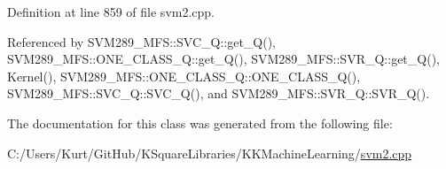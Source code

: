 Definition at line 859 of file svm2.\+cpp.



Referenced by S\+V\+M289\+\_\+\+M\+F\+S\+::\+S\+V\+C\+\_\+\+Q\+::get\+\_\+\+Q(), S\+V\+M289\+\_\+\+M\+F\+S\+::\+O\+N\+E\+\_\+\+C\+L\+A\+S\+S\+\_\+\+Q\+::get\+\_\+\+Q(), S\+V\+M289\+\_\+\+M\+F\+S\+::\+S\+V\+R\+\_\+\+Q\+::get\+\_\+\+Q(), Kernel(), S\+V\+M289\+\_\+\+M\+F\+S\+::\+O\+N\+E\+\_\+\+C\+L\+A\+S\+S\+\_\+\+Q\+::\+O\+N\+E\+\_\+\+C\+L\+A\+S\+S\+\_\+\+Q(), S\+V\+M289\+\_\+\+M\+F\+S\+::\+S\+V\+C\+\_\+\+Q\+::\+S\+V\+C\+\_\+\+Q(), and S\+V\+M289\+\_\+\+M\+F\+S\+::\+S\+V\+R\+\_\+\+Q\+::\+S\+V\+R\+\_\+\+Q().



The documentation for this class was generated from the following file\+:\begin{DoxyCompactItemize}
\item 
C\+:/\+Users/\+Kurt/\+Git\+Hub/\+K\+Square\+Libraries/\+K\+K\+Machine\+Learning/\hyperlink{svm2_8cpp}{svm2.\+cpp}\end{DoxyCompactItemize}
